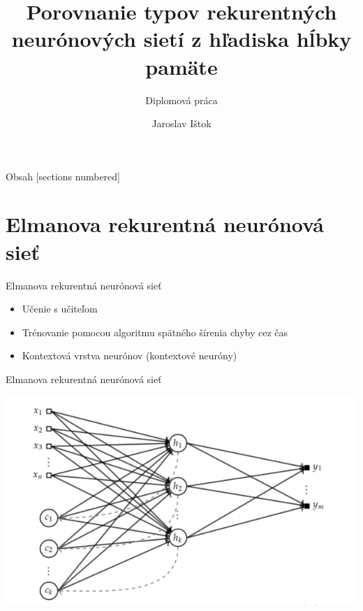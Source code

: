 \documentclass[10pt]{beamer}
\title{Porovnanie typov rekurentných neurónových sietí z hľadiska hĺbky pamäte}
\subtitle{Diplomová práca}
\date{}
\author{Jaroslav Ištok}
\begin{document}
\maketitle

\begin{frame}{Obsah}
  [sections numbered]
  \tableofcontents[hideallsubsections]
\end{frame}


\section{Elmanova rekurentná neurónová sieť}

\begin{frame}[fragile]{Elmanova rekurentná neurónová sieť}
\begin{itemize}
\item Učenie s učiteľom 
\item Trénovanie pomocou algoritmu spätného šírenia chyby cez čas
\item Kontextová vrstva neurónov (kontextové neuróny)
\end{itemize}
\end{frame}

\begin{frame}[fragile]{Elmanova rekurentná neurónová sieť}

\includegraphics[width=\textwidth]{elman}

\end{frame}
\end{document}
